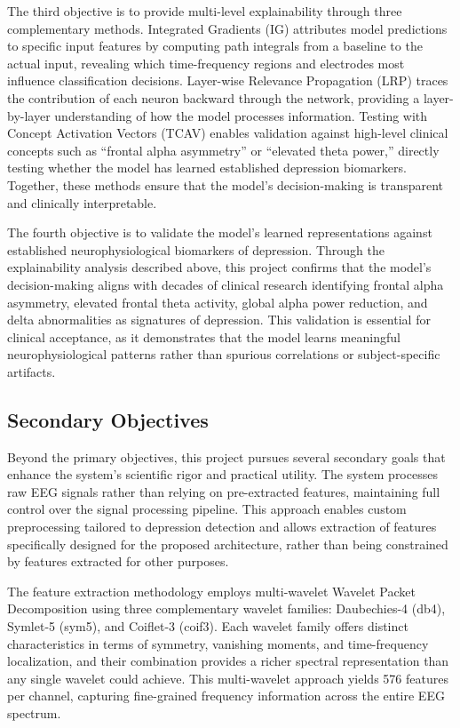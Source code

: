 The third objective is to provide multi-level explainability through three complementary methods. Integrated Gradients (IG) attributes model predictions to specific input features by computing path integrals from a baseline to the actual input, revealing which time-frequency regions and electrodes most influence classification decisions. Layer-wise Relevance Propagation (LRP) traces the contribution of each neuron backward through the network, providing a layer-by-layer understanding of how the model processes information. Testing with Concept Activation Vectors (TCAV) enables validation against high-level clinical concepts such as ``frontal alpha asymmetry'' or ``elevated theta power,'' directly testing whether the model has learned established depression biomarkers. Together, these methods ensure that the model's decision-making is transparent and clinically interpretable.

The fourth objective is to validate the model's learned representations against established neurophysiological biomarkers of depression. Through the explainability analysis described above, this project confirms that the model's decision-making aligns with decades of clinical research identifying frontal alpha asymmetry, elevated frontal theta activity, global alpha power reduction, and delta abnormalities as signatures of depression. This validation is essential for clinical acceptance, as it demonstrates that the model learns meaningful neurophysiological patterns rather than spurious correlations or subject-specific artifacts.

\subsection{Secondary Objectives}

Beyond the primary objectives, this project pursues several secondary goals that enhance the system's scientific rigor and practical utility. The system processes raw EEG signals rather than relying on pre-extracted features, maintaining full control over the signal processing pipeline. This approach enables custom preprocessing tailored to depression detection and allows extraction of features specifically designed for the proposed architecture, rather than being constrained by features extracted for other purposes.

The feature extraction methodology employs multi-wavelet Wavelet Packet Decomposition using three complementary wavelet families: Daubechies-4 (db4), Symlet-5 (sym5), and Coiflet-3 (coif3). Each wavelet family offers distinct characteristics in terms of symmetry, vanishing moments, and time-frequency localization, and their combination provides a richer spectral representation than any single wavelet could achieve. This multi-wavelet approach yields 576 features per channel, capturing fine-grained frequency information across the entire EEG spectrum.

